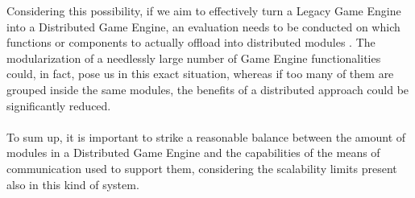 Considering this possibility, if we aim to effectively turn a Legacy Game Engine into a Distributed Game Engine, an evaluation needs to be conducted on which functions or components to actually offload into distributed modules \cite{womak:performance-analysis-game-engine}. The modularization of a needlessly large number of Game Engine functionalities could, in fact, pose us in this exact situation, whereas if too many of them are grouped inside the same modules, the benefits of a distributed approach could be significantly reduced. \\ \\
To sum up, it is important to strike a reasonable balance between the amount of modules in a Distributed Game Engine and the capabilities of the means of communication used to support them, considering the scalability limits present also in this kind of system.

